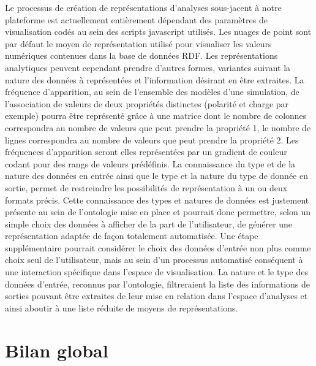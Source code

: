 Le processus de création de représentations d'analyses sous-jacent à notre plateforme est actuellement entièrement dépendant des paramètres de visualisation codés au sein des scripts javascript utilisés. Les nuages de point sont par défaut le moyen de représentation utilisé pour visualiser les valeurs numériques contenues dans la base de données RDF. Les représentations analytiques peuvent cependant prendre d'autres formes, variantes suivant la nature des données à représentées et l'information désirant en être extraites. 
La fréquence d'apparition, au sein de l'ensemble des modèles d'une simulation, de l'association de valeurs de deux propriétés distinctes (polarité et charge par exemple) pourra être représenté grâce à une matrice dont le nombre de colonnes correspondra au nombre de valeurs que peut prendre la propriété 1, le nombre de lignes correspondra au nombre de valeurs que peut prendre la propriété 2. Les fréquences d'apparition seront elles représentées par un gradient de couleur codant pour des rangs de valeurs prédéfinis.
La connaissance du type et de la nature des données en entrée ainsi que le type et la nature du type de donnée en sortie, permet de restreindre les possibilités de représentation à un ou deux formats précis. Cette connaissance des types et natures de données est justement présente au sein de l'ontologie mise en place et pourrait donc permettre, selon un simple choix des données à afficher de la part de l'utilisateur, de générer une représentation adaptée de façon totalement automatisée. 
Une étape supplémentaire pourrait considérer le choix des données d'entrée non plus comme choix seul de l'utilisateur, mais au sein d'un processus automatisé conséquent à une interaction spécifique dans l'espace de visualisation. La nature et le type des données d'entrée, reconnus par l'ontologie, filtreraient la liste des informations de sorties pouvant être extraites de leur mise en relation dans l'espace d'analyses et ainsi aboutir à une liste réduite de moyens de représentations.

\section*{Bilan global}

